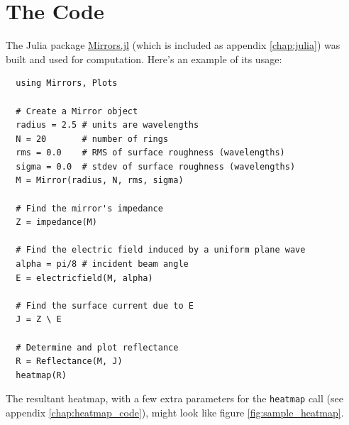 \documentclass[etd,senior,noacknowledgments]{BYUPhys}
\begin{document}

\section{The Code}\label{sec:code}

The Julia package \href{https://github.com/mjg0/Mirrors.jl}{Mirrors.jl} (which is included as appendix \ref{chap:julia}) was built and used for computation. Here's an example of its usage:

\begin{verbatim}
  using Mirrors, Plots

  # Create a Mirror object
  radius = 2.5 # units are wavelengths
  N = 20       # number of rings
  rms = 0.0    # RMS of surface roughness (wavelengths)
  sigma = 0.0  # stdev of surface roughness (wavelengths)
  M = Mirror(radius, N, rms, sigma)

  # Find the mirror's impedance
  Z = impedance(M)

  # Find the electric field induced by a uniform plane wave
  alpha = pi/8 # incident beam angle
  E = electricfield(M, alpha)

  # Find the surface current due to E
  J = Z \ E

  # Determine and plot reflectance
  R = Reflectance(M, J)
  heatmap(R)
\end{verbatim}

The resultant heatmap, with a few extra parameters for the \texttt{heatmap} call (see appendix \ref{chap:heatmap_code}), might look like figure \ref{fig:sample_heatmap}.
\end{document}
